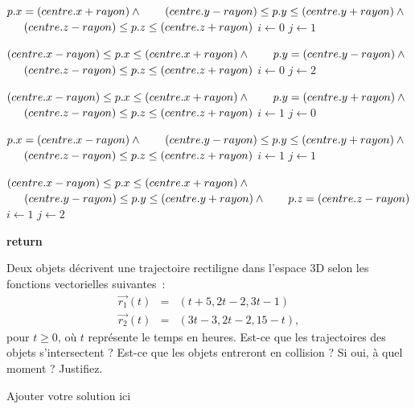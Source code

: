 \documentclass[12pt,addpoints]{exam}
\begin{document}
\begin{questions}
\begin{solution}
\begin{algorithmic}
	\If
	{
		$p.x = (centre.x + rayon) \land \newline$
		$\indent (centre.y - rayon) \leq p.y \leq (centre.y + rayon) \land \newline$
		$\indent (centre.z - rayon) \leq p.z \leq (centre.z + rayon)$
	}
		\State $i \gets 0$
		\State $j \gets 1$
	\EndIf

	\If 
	{
		$(centre.x - rayon) \leq p.x \leq (centre.x + rayon) \land \newline$
		$\indent p.y = (centre.y - rayon) \land \newline$
		$\indent (centre.z - rayon) \leq p.z \leq (centre.z + rayon)$
	}
		\State $i \gets 0$
		\State $j \gets 2$
	\EndIf

	\If 
	{
		$(centre.x - rayon) \leq p.x \leq (centre.x + rayon) \land \newline$
		$\indent p.y = (centre.y + rayon) \land \newline$
		$\indent (centre.z - rayon) \leq p.z \leq (centre.z + rayon)$
	}
		\State $i \gets 1$
		\State $j \gets 0$
	\EndIf

	\If 
	{
		$p.x = (centre.x - rayon) \land \newline$
		$\indent (centre.y - rayon) \leq p.y \leq (centre.y + rayon) \land \newline$
		$\indent (centre.z - rayon) \leq p.z \leq (centre.z + rayon)$
	}
		\State $i \gets 1$
		\State $j \gets 1$
	\EndIf

	\If 
	{
		$(centre.x - rayon) \leq p.x \leq (centre.x + rayon) \land \newline$
		$\indent (centre.y - rayon) \leq p.y \leq (centre.y + rayon) \land \newline$
		$\indent p.z = (centre.z - rayon)$
	}
		\State $i \gets 1$
		\State $j \gets 2$
	\EndIf

	\State \textbf{return} 
	\EndFunction
	\end{algorithmic}
\end{solution}

\question[15]
Deux objets décrivent une trajectoire rectiligne dans l'espace 3D selon les fonctions vectorielles suivantes~:
\begin{eqnarray*}
  \vec{r_1}(t) & = & (t + 5, 2t - 2, 3t - 1) \\
  \vec{r_2}(t) & = & (3t - 3, 2t - 2, 15 - t),
\end{eqnarray*}
pour $t \geq 0$, où $t$ représente le temps en heures. Est-ce que les trajectoires des objets s'intersectent ? Est-ce que les objets entreront en collision ? Si oui, à quel moment ? Justifiez.
\begin{solution}
Ajouter votre solution ici
\end{solution}


\end{questions}
\end{document}
